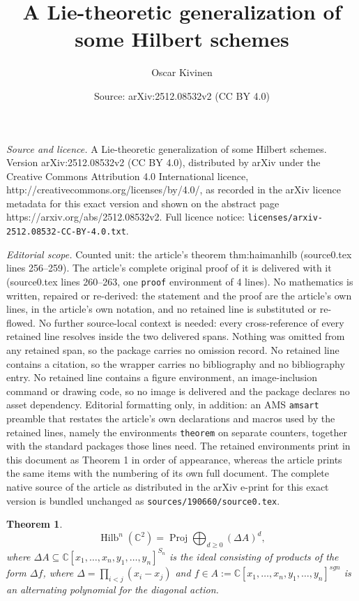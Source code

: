 \documentclass[10pt,a4paper]{amsart}
\title{A Lie-theoretic generalization of some Hilbert schemes}
\author{Oscar Kivinen}
\date{Source: arXiv:2512.08532v2 (CC BY 4.0)}
\newtheorem{theorem}{Theorem}
\newcommand{\C}{{\mathbb C}}
\DeclareMathOperator{\Hilb}{Hilb}
\DeclareMathOperator{\Proj}{\mathrm{Proj}}
\begin{document}
\maketitle

\noindent\emph{Source and licence.} A Lie-theoretic generalization of some Hilbert schemes. Version arXiv:2512.08532v2 (CC BY 4.0), distributed by arXiv under the Creative Commons Attribution 4.0 International licence, http://creativecommons.org/licenses/by/4.0/, as recorded in the arXiv licence metadata for this exact version and shown on the abstract page https://arxiv.org/abs/2512.08532v2. Full licence notice: \texttt{licenses/arxiv-2512.08532-CC-BY-4.0.txt}.\par\smallskip

\noindent\textit{Editorial scope.} Counted unit: the article's theorem thm:haimanhilb (source0.tex lines 256--259). The article's complete original proof of it is delivered with it (source0.tex lines 260--263, one \texttt{proof} environment of 4 lines). No mathematics is written, repaired or re-derived: the statement and the proof are the article's own lines, in the article's own notation, and no retained line is substituted or re-flowed.  No further source-local context is needed: every cross-reference of every retained line resolves inside the two delivered spans.  Nothing was omitted from any retained span, so the package carries no omission record.  No retained line contains a citation, so the wrapper carries no bibliography and no bibliography entry.  No retained line contains a figure environment, an image-inclusion command or drawing code, so no image is delivered and the package declares no asset dependency.  Editorial formatting only, in addition: an AMS \texttt{amsart} preamble that restates the article's own declarations and macros used by the retained lines, namely the environments \texttt{theorem} on separate counters, together with the standard packages those lines need.  The retained environments print in this document as Theorem 1 in order of appearance, whereas the article prints the same items with the numbering of its own full document.  The complete native source of the article as distributed in the arXiv e-print for this exact version is bundled unchanged as \texttt{sources/190660/source0.tex}.
\begin{theorem}
\label{thm:haimanhilb}
$$\Hilb^n(\C^2)=\Proj\bigoplus_{d\geq 0} (\Delta A)^d,$$ where $\Delta A\subseteq \C[x_1,\ldots,x_n, y_1,\ldots,y_n]^{S_n}$ is the ideal consisting of products of the form $\Delta f$, where $\Delta=\prod_{i<j}(x_i-x_j)$ and $f\in A:=\C[x_1,\ldots, x_n,y_1,\ldots,y_n]^{sgn}$ is an alternating polynomial for the diagonal action.
\end{theorem}
\end{document}
